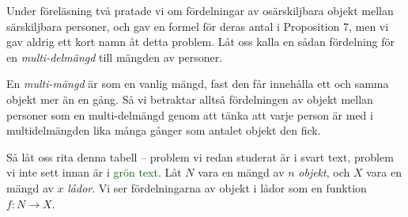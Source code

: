 \documentclass[nobib]{tufte-handout}
\begin{document}
Under föreläsning två pratade vi om fördelningar av osärskiljbara objekt mellan särskiljbara personer, och gav en formel för deras antal i Proposition 7, men vi gav aldrig ett kort namn åt detta problem. Låt oss kalla en sådan fördelning för en \emph{multi-delmängd} till mängden av personer.

En \emph{multi-mängd} är som en vanlig mängd, fast den får innehålla ett och samma objekt mer än en gång. Så vi betraktar alltså fördelningen av objekt mellan personer som en multi-delmängd genom att tänka att varje person är med i multidelmängden lika många gånger som antalet objekt den fick.

Så låt oss rita denna tabell -- problem vi redan studerat är i svart text, problem vi inte sett innan är i \textcolor{darkgreen}{grön text}. Låt $N$ vara en mängd av $n$ \emph{objekt}, och $X$ vara en mängd av $x$ \emph{lådor}. Vi ser fördelningarna av objekt i lådor som en funktion $f: N \to X$.
\end{document}
